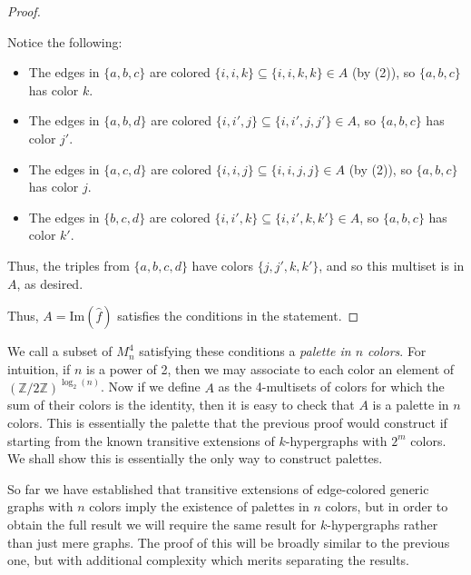 \documentclass{amsart}
\def\Z{\mathbb{Z}}
\begin{document}
\begin{proof}
\begin{enumerate}
\begin{center}
\begin{tikzpicture}
        \end{tikzpicture}
        \end{center}

        Notice the following:
        \begin{itemize}
            \item The edges in $\{a,b,c\}$ are colored $\{i, i , k\} \subseteq \{i, i, k, k\} \in A$ (by (2)), so $\{a,b,c\}$ has color $k$.
            \item The edges in $\{a,b,d\}$ are colored $\{i, i', j\} \subseteq \{i, i', j, j'\} \in A$, so $\{a,b,c\}$ has color $j'$.
            \item The edges in $\{a,c,d\}$ are colored $\{i, i , j\} \subseteq \{i, i, j, j\} \in A$ (by (2)), so $\{a,b,c\}$ has color $j$.
            \item The edges in $\{b,c,d\}$ are colored $\{i, i' , k\} \subseteq \{i, i', k, k'\} \in A$, so $\{a,b,c\}$ has color $k'$.
        \end{itemize}
        Thus, the triples from $\{a, b, c, d\}$ have colors $\{j, j', k, k'\}$, and so this multiset is in $A$, as desired.
    \end{enumerate}
    Thus, $A = \textrm{Im}(\hat f)$ satisfies the conditions in the statement.
\end{proof}

We call a subset of $M_n^4$ satisfying these conditions a \emph{palette in $n$ colors}. For intuition, if $n$ is a power of 2, then we may associate to each color an element of $(\Z/2\Z)^{\log_2(n)}$. Now if we define $A$ as the 4-multisets of colors for which the sum of their colors is the identity, then it is easy to check that $A$ is a palette in $n$ colors. This is essentially the palette that the previous proof would construct if starting from the known transitive extensions of $k$-hypergraphs with $2^m$ colors. We shall show this is essentially the only way to construct palettes.

So far we have established that transitive extensions of edge-colored generic graphs with $n$ colors imply the existence of palettes in $n$ colors, but in order to obtain the full result we will require the same result for $k$-hypergraphs rather than just mere graphs. The proof of this will be broadly similar to the previous one, but with additional complexity which merits separating the results.
\end{document}
